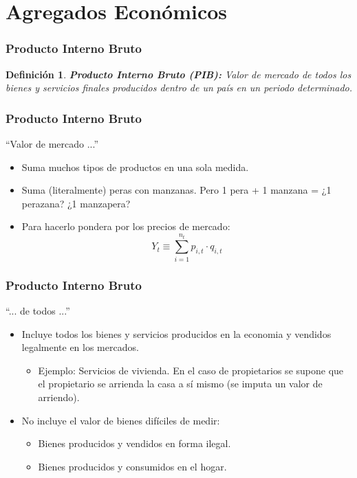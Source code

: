 \documentclass[dvipsnames,table,leqno]{beamer}
\newtheorem{mydef}{Definición}
\newcommand{\peq}[1]{{\scriptscriptstyle{#1}}}
\begin{document}
	\section{Agregados Económicos}

		\begin{frame}
			\frametitle{Producto Interno Bruto}
			\begin{mydef}
				\textbf{Producto Interno Bruto (PIB):} Valor de mercado de todos los bienes y servicios finales producidos dentro de un país en un periodo determinado.
			\end{mydef}
		\end{frame}

		\begin{frame}
			\frametitle{Producto Interno Bruto}
			``Valor de mercado ...''
			\begin{itemize}
				\item Suma muchos tipos de productos en una sola medida.
				\item Suma (literalmente) peras con manzanas. Pero 1 pera + 1 manzana = ¿1 perazana? ¿1 manzapera?
				\item Para hacerlo pondera por los precios de mercado: $$Y_\peq{t}\equiv\sum_\peq{i=1}^{n_\peq{t}}{p_\peq{i,t}\cdot q_\peq{i,t}}$$
			\end{itemize}
		\end{frame}

		\begin{frame}
			\frametitle{Producto Interno Bruto}
			``... de todos ...''
			\begin{itemize}
				\item Incluye todos los bienes y servicios producidos en la economia y vendidos legalmente en los mercados.
					\begin{itemize}
						\item Ejemplo: Servicios de vivienda. En el caso de propietarios se supone que el propietario se arrienda la casa a sí mismo (se imputa un valor de arriendo).
					\end{itemize}
				\item No incluye el valor de bienes difíciles de medir:
					\begin{itemize}
						\item Bienes producidos y vendidos en forma ilegal.
						\item Bienes producidos y consumidos en el hogar.
					\end{itemize}
			\end{itemize}
		\end{frame}
\end{document}
